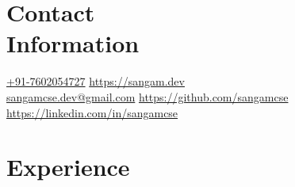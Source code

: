 \documentclass[margin,line]{resume}
\begin{document}
\begin{resume}
    \section{\mysidestyle Contact\\Information}
    \href{tel:+917602054727}{+91-7602054727}                                      \hfill    \url{https://sangam.dev}\\%
    \href{mailto:sangamcse.dev@gmail.com}{sangamcse.dev@gmail.com}      \hfill    \url{https://github.com/sangamcse}\\%
    \null                                                            \hfill    \url{https://linkedin.com/in/sangamcse}%

    \section{\mysidestyle Experience}


\end{resume}
\end{document}
